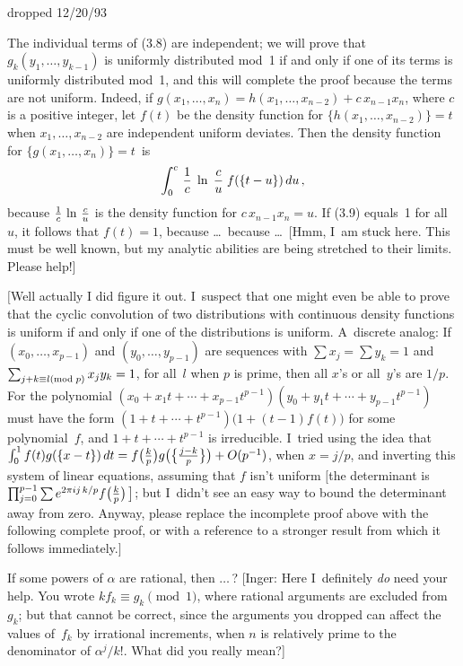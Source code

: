 \bye


dropped 12/20/93

The individual terms of (3.8) are independent; we will prove that
$g_k(y_1,\ldots, y_{k-1})$ is uniformly distributed mod~1 if and only if
one of its terms is uniformly distributed mod~1, and this will complete the
proof because the terms are not uniform. Indeed, if 
$g(x_1,\ldots,x_n)=h(x_1,\ldots,x_{n-2})+c\,x_{n-1}x_n$, where $c$ is a
positive integer, let $f(t)$ be the density function for 
$\{h(x_1,\ldots,x_{n-2})\}=t$ when $x_1,\ldots,x_{n-2}$ are independent uniform
deviates. Then the density function for $\{g(x_1,\ldots,x_n)\}=t$~is
$$\int_0^c\,{1\over c}\;\ln\;{c\over u}\;f(\{t-u\})\,du\,,$$
because ${1\over c}\,\ln\,{c\over u}$ is the density function for
$c\,x_{n-1}x_n=u$. If (3.9) equals~1 for all~$u$, it follows that $f(t)=1$,
because \dots\ because \dots\ [Hmm, I~am stuck here.
This must be well known, but
my analytic abilities are being stretched to their limits. Please help!] \
\pfbox

\medskip
$\bigr[$Well 
actually I did figure it out. I~suspect that one might even be able to
prove that the cyclic convolution of two distributions with continuous density
functions is uniform if and only if one of the distributions is uniform. 
A~discrete analog: If $(x_0,\ldots,x_{p-1})$ and $(y_0,\ldots,y_{p-1})$ are
sequences with $\sum x_j=\sum y_k=1$ and $\sum_{j+k\equiv l({\rm mod}\;p)}
 x_jy_k=1$,
for all~$l$ when $p$ is prime, then all $x$'s or all~$y$'s are $1/p$. For the
polynomial $(x_0+x_1t+\cdots +x_{p-1}t^{p-1}) 
(y_0+y_1t+\cdots +y_{p-1}t^{p-1})$ 
must have the form $(1+t+\cdots +t^{p-1})\bigl(1+(t-1)f(t)\bigr)$
for some polynomial~$f$, and
$1+t+\cdots +t^{p-1}$ is irreducible. I~tried using the idea that
$\int_0^1f(t)g(\{x-t\})\,dt=f\bigl({k\over
p}\bigr)g\bigl(\bigl\{{j-k\over p}\bigr\}\bigr)+O(p^{-1})$, when $x=j/p$,
and inverting this system of linear equations, assuming that $f$ isn't uniform
$\bigl[$the determinant is 
$\prod_{j=0}^{p-1}\sum e^{2\pi ij\,k/p}f\bigl({k\over p}\bigr)\,\bigl]$; but
I~didn't see an easy way to bound the determinant away from zero. Anyway, 
please
replace the incomplete proof above with the following complete proof, or with a
reference to a stronger result from which it follows immediately.$\bigr]$


If some powers of $\alpha$ are rational, then $\ldots\,$? [Inger: Here
I~definitely {\it do\/} need your help. You wrote $kf_k\equiv g_k\pmod{1}$,
where rational arguments are excluded from~$g_k$; but that cannot be correct,
since the arguments you dropped can affect the values of~$f_k$ by irrational
increments, when $n$ is relatively prime to the denominator of $\alpha^j\!/k!$.
What did you really mean?] \ \pfbox
